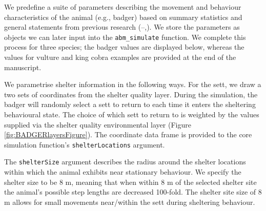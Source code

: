 \documentclass[10pt,a4paper]{article}
\newenvironment{Shaded}{}{}
\newcommand{\AttributeTok}[1]{#1}
\newcommand{\ConstantTok}[1]{#1}
\newcommand{\DecValTok}[1]{#1}
\newcommand{\FloatTok}[1]{#1}
\newcommand{\FunctionTok}[1]{#1}
\newcommand{\NormalTok}[1]{#1}
\newcommand{\OtherTok}[1]{#1}
\newcommand{\SpecialCharTok}[1]{#1}
\newcommand{\StringTok}[1]{#1}
\begin{document}
We predefine a suite of parameters describing the movement and behaviour characteristics of the animal (e.g., badger) based on summary statistics and general statements from previous research (--,).
We store the parameters as objects we can later input into the \texttt{abm\_simulate} function.
We complete this process for three species; the badger values are displayed below, whereas the values for vulture and king cobra examples are provided at the end of the manuscript.

We parametrise shelter information in the following ways.
For the sett, we draw a two sets of coordinates from the shelter quality layer.
During the simulation, the badger will randomly select a sett to return to each time it enters the sheltering behavioural state.
The choice of which sett to return to is weighted by the values supplied via the shelter quality environmental layer (Figure \ref{fig:BADGERlayersFigure}).
The coordinate data frame is provided to the core simulation function's \texttt{shelterLocations} argument.

The \texttt{shelterSize} argument describes the radius around the shelter locations within which the animal exhibits near stationary behaviour.
We specify the shelter size to be 8 m, meaning that when within 8 m of the selected shelter site the animal's possible step lengths are decreased 100-fold.
The shelter site size of 8 m allows for small movements near/within the sett during sheltering behaviour.

\begin{Shaded}
\end{Shaded}
\end{document}

